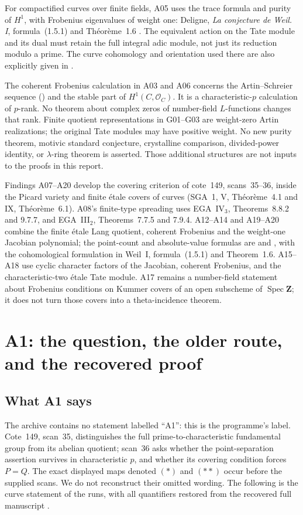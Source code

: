 \documentclass[11pt,a4paper]{article}
\begin{document}
For compactified curves over finite fields, A05 uses the trace
formula and purity of $H^1$, with Frobenius eigenvalues of weight one:
Deligne, \emph{La conjecture de Weil. I}, formula~(1.5.1) and
Th\'eor\`eme~1.6 \cite{WeilI}. The equivalent action on the
Tate module and its dual must retain the full integral adic module,
not just its reduction modulo a prime. The curve cohomology and
orientation used there are also explicitly given in
\cite[Proposition~14.2 and Remark~14.10]{MilneLEC}.

The coherent Frobenius calculation in A03 and A06 concerns the
Artin--Schreier sequence (\cite[Example~7.9(b)]{MilneLEC}) and the stable part of $H^1(C,\mathcal O_C)$.
It is a characteristic-$p$ calculation of $p$-rank. No theorem about
complex zeros of number-field $L$-functions changes that rank.
Finite quotient representations in G01--G03 are weight-zero Artin
realizations; the original Tate modules may have positive weight.
No new purity theorem, motivic standard conjecture, crystalline
comparison, divided-power identity, or $\lambda$-ring theorem is
asserted. Those additional structures are not inputs to the proofs
in this report.


Findings A07--A20 develop the covering criterion of cote~149,
scans~35--36, inside the Picard variety and finite \'etale covers of
curves (SGA~1, V, Th\'eor\`eme~4.1 and IX, Th\'eor\`eme~6.1).
A08's finite-type spreading uses EGA~IV$_3$, Theorems~8.8.2 and
9.7.7, and EGA~III$_2$, Theorems~7.7.5 and 7.9.4.
A12--A14 and A19--A20 combine the finite \'etale Lang quotient,
coherent Frobenius and the weight-one Jacobian polynomial; the
point-count and absolute-value formulas are
\cite[Theorem~19.1(a)--(c)]{MilneAV} and
\cite[Theorem~11.1]{MilneJV}, with the cohomological formulation
in Weil~I, formula~(1.5.1) and Theorem~1.6.
A15--A18 use cyclic character factors of the Jacobian, coherent
Frobenius, and the characteristic-two \'etale Tate module.
A17 remains a number-field statement about Frobenius conditions
on Kummer covers of an open subscheme of $\operatorname{Spec}\mathbf Z$;
it does not turn those covers into a theta-incidence theorem.


\section{A1: the question, the older route, and the recovered proof}
\label{sec:a1}

\subsection{What A1 says}
The archive contains no statement labelled ``A1'': this is the programme's
label. Cote~149, scan~35, distinguishes the full prime-to-characteristic
fundamental group from its abelian quotient; scan~36 asks whether the
point-separation assertion survives in characteristic $p$, and whether its
covering condition forces $P=Q$. The exact displayed maps denoted $(*)$ and
$(**)$ occur before the supplied scans. We do not reconstruct their omitted
wording. The following is the curve statement of the runs, with all
quantifiers restored from the recovered full manuscript
\cite[A.1, A.31--A.33]{A1run}.
\end{document}
